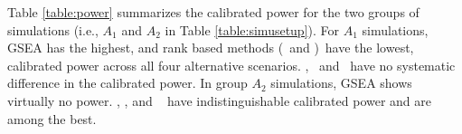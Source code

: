 	Table \ref{table:power} summarizes the calibrated power for the two groups of simulations (i.e.,
	$A_1$ and $A_2$ in Table \ref{table:simusetup}). %
	For $A_1$ simulations, GSEA has the highest, and rank based methods (\genr~and \CMR)~have the
	lowest, calibrated power across all four alternative scenarios. \CMT, \gent~and \OurMethod~have 
	no
	systematic difference in the calibrated power. %
	In group $A_2$ simulations, GSEA shows virtually no power. \OurMethod, \CMT, and \gent~ have
	indistinguishable calibrated power and are among the best.
	
